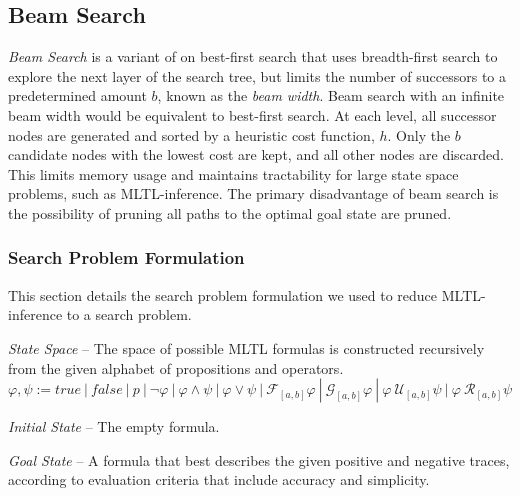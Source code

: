 \documentclass[12pt]{article}
\renewcommand{\phi}{\varphi}
\newcommand{\Until}{\ \mathcal{U}}         %
\newcommand{\Release}{\ \mathcal{R}}       %
\newcommand{\Globally}{\mathcal{G}}          %
\newcommand{\Finally}{\mathcal{F}}           %
\begin{document}
\subsection{Beam Search}


\textit{Beam Search} is a variant of on best-first search that uses breadth-first search to explore the next layer of the search tree, but limits the number of successors to a predetermined amount $b$, known as the \textit{beam width}. Beam search with an infinite beam width would be equivalent to best-first search. At each level, all successor nodes are generated and sorted by a heuristic cost function, $h$. Only the $b$ candidate nodes with the lowest cost are kept, and all other nodes are discarded. This limits memory usage and maintains tractability for large state space problems, such as MLTL-inference. The primary disadvantage of beam search is the possibility of pruning all paths to the optimal goal state are pruned.

\subsubsection{Search Problem Formulation}

This section details the search problem formulation we used to reduce MLTL-inference to a search problem.

\textit{State Space} -- The space of possible MLTL formulas is constructed recursively from the given alphabet of propositions and operators.
\[
\phi, \psi := true \ | \ false \ | \ p \ | \ \neg \phi \ | \ \phi \land \psi \ | \ \phi \lor \psi \ | \ \Finally_{[a,b]} \phi \ | \ \Globally_{[a,b]} \phi \ | \ \phi \Until_{[a,b]} \psi \ | \ \phi \Release_{[a,b]} \psi
\]

\textit{Initial State} -- The empty formula.

\textit{Goal State} -- A formula that best describes the given positive and negative traces, according to evaluation criteria that include accuracy and simplicity.
\end{document}
